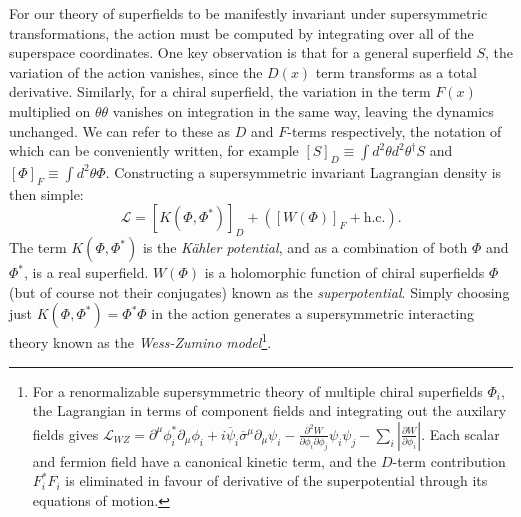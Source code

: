 For our theory of superfields to be manifestly invariant under supersymmetric transformations, the action must be computed by integrating over all of the superspace coordinates. One key observation is that for a general superfield $S$, the variation of the action vanishes, since the $D(x)$ term transforms as a total derivative. Similarly, for a chiral superfield, the variation in the term $F(x)$ multiplied on $\theta\theta$ vanishes on integration in the same way, leaving the dynamics unchanged. We can refer to these as $D$ and $F$-terms respectively, the notation of which can be conveniently written, for example $\left[S \right]_{D}\equiv \int d^2 \theta d^2 \theta^{\dagger}S$ and $\left[ \Phi \right]_{F}\equiv \int d^2 \theta \Phi$. Constructing a supersymmetric invariant Lagrangian density is then simple:
\begin{equation}
\mathcal{L}=\left[ K(\Phi,\Phi^{*}) \right]_{D} + \left( \left[ W(\Phi) \right]_{F}+ \text{h.c.}\right). 
\end{equation}
The term $K(\Phi,\Phi^{*})$ is the \textit{K{\"a}hler potential}, and as a combination of both $\Phi$ and $\Phi^{*}$, is a real superfield. $W(\Phi)$ is a holomorphic function of chiral superfields $\Phi$ (but of course not their conjugates) known as the \textit{superpotential}. Simply choosing just $K(\Phi,\Phi^{*})=\Phi^{*}\Phi$ in the action generates a supersymmetric interacting theory known as the \textit{Wess-Zumino model}\footnote{For a renormalizable supersymmetric theory of multiple chiral superfields $\Phi_i$, the Lagrangian in terms of component fields and integrating out the auxilary fields gives $\mathcal{L}_{WZ}=\partial^{\mu}\phi^{*}_{i}\partial_{\mu}\phi_i+i\overline{\psi}_{i}\overline{\sigma}^{\mu}\partial_{\mu}\psi_{i}-\frac{\partial^{2}W}{\partial\phi_{i}\partial \phi_{j}}\psi_{i}\psi_{j}-\sum_{i}\left| \frac{\partial W}{\partial \phi_{i}}\right|$. Each scalar and fermion field have a canonical kinetic term, and the $D$-term contribution $F^{*}_{i}F_{i}$ is eliminated in favour of derivative of the superpotential through its equations of motion.}\cite{RN534}.

